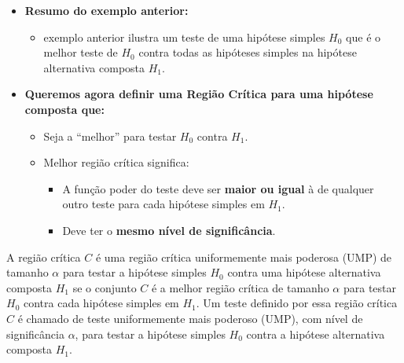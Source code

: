 \documentclass[12pt]{beamer}
\begin{document}
\begin{frame}{}
\begin{block}{}
\justifying
\begin{itemize}
	\item \textbf{Resumo do exemplo anterior:}
	\begin{itemize}
		\item exemplo anterior ilustra um teste de uma hipótese simples $H_0$ que é o melhor teste de $H_0$ contra todas as hipóteses simples na hipótese alternativa composta $H_1$.
	\end{itemize}
	
	\item \textbf{Queremos agora definir uma Região Crítica para uma hipótese composta que:}
	\begin{itemize}
		\item Seja a ``melhor'' para testar $H_0$ contra $H_1$.\pause
		\item Melhor região crítica significa:
		\begin{itemize}
			\item A função poder do teste deve ser \textbf{maior ou igual} à de qualquer outro teste para cada hipótese simples em $H_1$.\pause
			\item Deve ter o \textbf{mesmo nível de significância}.
		\end{itemize}
	\end{itemize}
\end{itemize}

\end{block}
\end{frame}

\begin{frame}{}
\begin{definicao}
\justifying
A região crítica $C$ é uma região crítica uniformemente mais poderosa (UMP) de tamanho $\alpha$ para testar a hipótese simples $H_0$ contra uma hipótese alternativa composta $H_1$ se o conjunto $C$ é a melhor região crítica de tamanho $\alpha$ para testar $H_0$ contra cada hipótese simples em $H_1$. Um teste definido por essa região crítica $C$ é chamado de teste uniformemente mais poderoso (UMP), com nível de significância $\alpha$, para testar a hipótese simples $H_0$ contra a hipótese alternativa composta $H_1$.
\end{definicao}
\end{frame}
\end{document}
